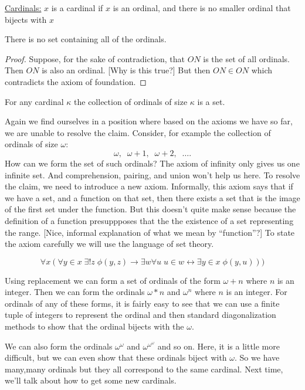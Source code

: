 \documentclass[english,course]{Notes}
\begin{document}
\medskip
 
\noindent \underline{Cardinals:} $x$ is a cardinal if $x$ is an ordinal, and 
there is no smaller ordinal that bijects with $x$

\begin{theorem}
There is no set containing all of the ordinals.
\end{theorem}

\begin{proof}
Suppose, for the sake of contradiction, that $ON$ is the 
set of all ordinals. Then $ON$ is also an ordinal. [Why is 
this true?] But then $ON \in ON$ which contradicts the axiom of foundation. 
\end{proof}

\begin{claim} 
For any cardinal $\kappa$ the collection of ordinals of 
size $\kappa$ is a set. 
\end{claim} 

Again we find ourselves in a position where based on the axioms we have so far, 
we are unable to resolve the claim. Consider, for example the collection of ordinals of size 
$\omega$:
$$ \omega,\;\; \omega + 1,\;\; \omega + 2,\;\; \dots.$$ 
How can we form the set of such ordinals? 
The axiom of infinity only gives us one infinite set. And comprehension, 
pairing, and union won't help us here. To resolve the claim, we need to 
introduce a new axiom. Informally, this axiom says that
if we have a set, and a function on that set, then there exists a set that is 
the image of the first set under the function. But this doesn't quite 
make sense because the definition of a function presuppposes that the the 
existence of a set representing the range. [Nice, informal explanation of what 
we mean by ``function''?] To state the axiom carefully we 
will use the language of set theory. 

\medskip

$$\forall x(\forall y \in x \; \exists ! z \; \phi(y,z) \rightarrow \exists w \forall 
u \; u \in w \leftrightarrow \exists y \in x \; \phi(y, u)))$$

\medskip

Using replacement we can form a set of ordinals of the form $\omega + n$ where 
$n$ is an integer. Then we can form the ordinals $\omega * n$ 
and $\omega^n$  
where $n$ is an integer. For ordinals of any of these forms, it is fairly easy 
to see that we can use a finite tuple of integers to represent the ordinal and 
then standard diagonalization methods to show that the ordinal bijects with the 
$\omega$.  

We can also form the ordinals $\omega^\omega$ and 
$\omega^{\omega^\omega}$ and so on. Here, it is a little more difficult, but we 
can even show that these ordinals biject with $\omega$. So we have many,many 
ordinals but they all correspond to the same cardinal. Next time, we'll talk 
about how to get some new cardinals.  
\end{document}
